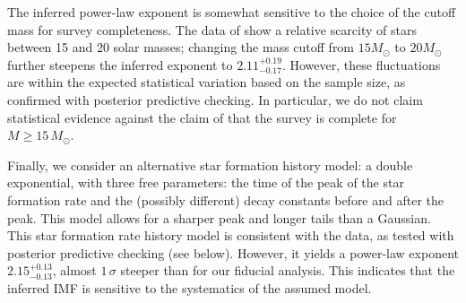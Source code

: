 \documentclass[apjl]{emulateapj}
\newcommand{\MSun}{M_\odot}
\newcommand{\onesigrange}[3]{\ensuremath{#1^{+#2}_{-#3}}}
\newcommand{\alpharangethree}{\onesigrange{2.11}{0.19}{0.17}}
\newcommand{\alpharangefour}{\onesigrange{2.15}{0.13}{0.13}}
\begin{document}
The inferred power-law exponent is somewhat sensitive to
the choice of the cutoff mass for survey completeness.  The data of \citet{Schneider:2018} show a relative scarcity of stars between 15 and 20 solar masses; changing the mass cutoff from $15 M_\odot$ to $20 M_\odot$ further steepens the inferred exponent to $\alpharangethree$.    However, these fluctuations are within the expected statistical
variation based on the sample size, as confirmed with posterior predictive
checking.  In particular, we do not claim statistical evidence against the claim of \citet{Schneider:2018} that
the survey is complete for $M \geq 15 \, \MSun$.

Finally, we consider an alternative star formation history model: a double exponential, with three free parameters: the time of the peak of the star formation rate and the (possibly different) decay constants before and after the peak.  This model allows for a sharper peak and longer tails than a Gaussian.  This star formation rate history model is consistent with the data, as tested with posterior predictive checking (see below).  However, it yields a power-law exponent $\alpharangefour$, almost  $1\, \sigma$ steeper than for our fiducial analysis.  This indicates that the inferred IMF is sensitive to the systematics of the assumed model.  
\end{document}
